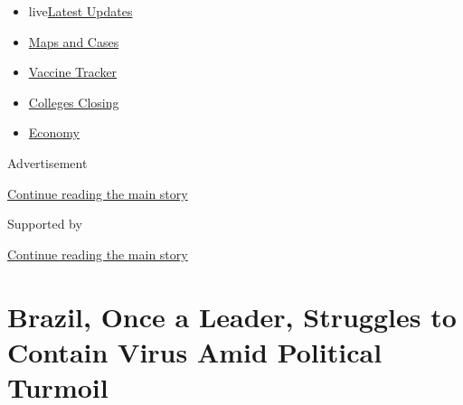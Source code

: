 \begin{itemize}
\tightlist
\item
  live\href{https://www.nytimes3xbfgragh.onion/2020/08/21/world/covid-19-coronavirus.html?name=styln-coronavirus-national\&region=TOP_BANNER\&variant=undefined\&block=storyline_menu_recirc\&action=click\&pgtype=Article\&impression_id=8b367dc1-e3a3-11ea-94af-ff08e013db7e}{Latest
  Updates}
\item
  \href{https://www.nytimes3xbfgragh.onion/interactive/2020/us/coronavirus-us-cases.html?name=styln-coronavirus-national\&region=TOP_BANNER\&variant=undefined\&block=storyline_menu_recirc\&action=click\&pgtype=Article\&impression_id=8b367dc2-e3a3-11ea-94af-ff08e013db7e}{Maps
  and Cases}
\item
  \href{https://www.nytimes3xbfgragh.onion/interactive/2020/science/coronavirus-vaccine-tracker.html?name=styln-coronavirus-national\&region=TOP_BANNER\&variant=undefined\&block=storyline_menu_recirc\&action=click\&pgtype=Article\&impression_id=8b367dc3-e3a3-11ea-94af-ff08e013db7e}{Vaccine
  Tracker}
\item
  \href{https://www.nytimes3xbfgragh.onion/2020/08/19/us/colleges-closing-covid.html?name=styln-coronavirus-national\&region=TOP_BANNER\&variant=undefined\&block=storyline_menu_recirc\&action=click\&pgtype=Article\&impression_id=8b367dc4-e3a3-11ea-94af-ff08e013db7e}{Colleges
  Closing}
\item
  \href{https://www.nytimes3xbfgragh.onion/live/2020/08/20/business/stock-market-today-coronavirus?name=styln-coronavirus-national\&region=TOP_BANNER\&variant=undefined\&block=storyline_menu_recirc\&action=click\&pgtype=Article\&impression_id=8b367dc5-e3a3-11ea-94af-ff08e013db7e}{Economy}
\end{itemize}

Advertisement

\protect\hyperlink{after-top}{Continue reading the main story}

Supported by

\protect\hyperlink{after-sponsor}{Continue reading the main story}

\hypertarget{brazil-once-a-leader-struggles-to-contain-virus-amid-political-turmoil}{%
\section{Brazil, Once a Leader, Struggles to Contain Virus Amid
Political
Turmoil}\label{brazil-once-a-leader-struggles-to-contain-virus-amid-political-turmoil}}

